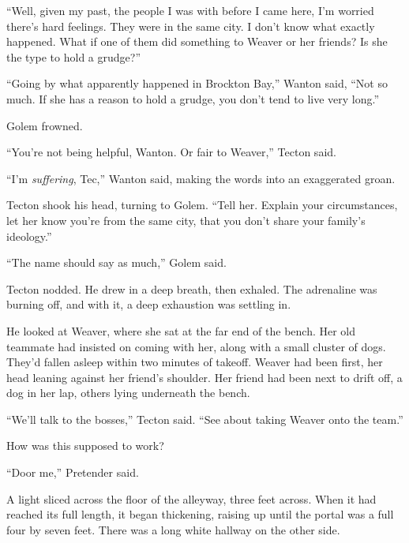 ``Well, given my past, the people I was with before I came here, I'm worried there's hard feelings.  They were in the same city.  I don't know what exactly happened.  What if one of them did something to Weaver or her friends?  Is she the type to hold a grudge?''



``Going by what apparently happened in Brockton Bay,'' Wanton said, ``Not so much.  If she has a reason to hold a grudge, you don't tend to live very long.''



Golem frowned.



``You're not being helpful, Wanton.  Or fair to Weaver,'' Tecton said.



``I'm \emph{suffering}, Tec,'' Wanton said, making the words into an exaggerated groan.



Tecton shook his head, turning to Golem.  ``Tell her.  Explain your circumstances, let her know you're from the same city, that you don't share your family's ideology.''



``The name should say as much,'' Golem said.



Tecton nodded.  He drew in a deep breath, then exhaled.  The adrenaline was burning off, and with it, a deep exhaustion was settling in.



He looked at Weaver, where she sat at the far end of the bench.  Her old teammate had insisted on coming with her, along with a small cluster of dogs.  They'd fallen asleep within two minutes of takeoff.  Weaver had been first, her head leaning against her friend's shoulder.  Her friend had been next to drift off, a dog in her lap, others lying underneath the bench.



``We'll talk to the bosses,'' Tecton said.  ``See about taking Weaver onto the team.''



\blacksquare



How was this supposed to work?



``Door me,'' Pretender said.



A light sliced across the floor of the alleyway, three feet across.  When it had reached its full length, it began thickening, raising up until the portal was a full four by seven feet.  There was a long white hallway on the other side.



